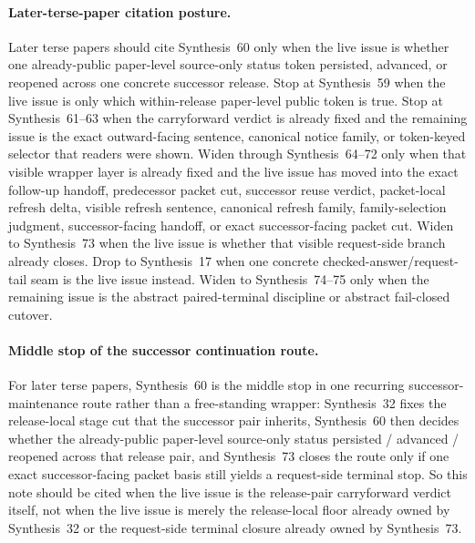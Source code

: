 \documentclass[11pt]{article}
\begin{document}
\paragraph{Later-terse-paper citation posture.}
Later terse papers should cite Synthesis~60 only when the live issue is whether one already-public paper-level source-only status token persisted, advanced, or reopened across one concrete successor release. Stop at Synthesis~59 when the live issue is only which within-release paper-level public token is true. Stop at Synthesis~61--63 when the carryforward verdict is already fixed and the remaining issue is the exact outward-facing sentence, canonical notice family, or token-keyed selector that readers were shown. Widen through Synthesis~64--72 only when that visible wrapper layer is already fixed and the live issue has moved into the exact follow-up handoff, predecessor packet cut, successor reuse verdict, packet-local refresh delta, visible refresh sentence, canonical refresh family, family-selection judgment, successor-facing handoff, or exact successor-facing packet cut. Widen to Synthesis~73 when the live issue is whether that visible request-side branch already closes. Drop to Synthesis~17 when one concrete checked-answer/request-tail seam is the live issue instead. Widen to Synthesis~74--75 only when the remaining issue is the abstract paired-terminal discipline or abstract fail-closed cutover.\cite{series:publicrequeststatusenvelopes,series:publicrequestnotices,series:publicrequestnoticenormalforms,series:publicrequestnoticeselections,series:publicrequestresponsemenus,series:publicrequestresponsepackets,series:publicrequestresponsepacketcarryforward,series:publicrequestresponsepacketdeltaledgers,series:publicrequestresponsepacketrefreshnotices,series:publicrequestresponsepacketrefreshnoticenormalforms,series:publicrequestresponsepacketrefreshnoticeselections,series:publicrequestresponsepacketrefreshresponsemenus,series:publicrequestresponsepacketrefreshresponsepackets,series:publicrequestresponsepacketrefreshresponsepacketclosureverdicts,series:pairedterminalcitationdiscipline,series:pairedterminalcutoverrule,series:workedexample}

\paragraph{Middle stop of the successor continuation route.}
For later terse papers, Synthesis~60 is the middle stop in one recurring successor-maintenance route rather than a free-standing wrapper: Synthesis~32 fixes the release-local stage cut that the successor pair inherits, Synthesis~60 then decides whether the already-public paper-level source-only status persisted / advanced / reopened across that release pair, and Synthesis~73 closes the route only if one exact successor-facing packet basis still yields a request-side terminal stop. So this note should be cited when the live issue is the release-pair carryforward verdict itself, not when the live issue is merely the release-local floor already owned by Synthesis~32 or the request-side terminal closure already owned by Synthesis~73.\cite{series:releasespine,series:publicrequestresponsepacketrefreshresponsepacketclosureverdicts}
\end{document}
